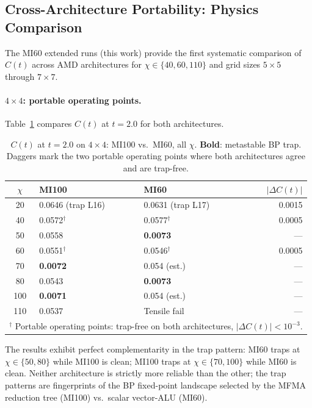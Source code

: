 \documentclass[11pt]{article}
\newcommand{\Ct}{C(t)}
\begin{document}
\subsection{Cross-Architecture Portability: Physics Comparison}
\label{sec:portability_physics}

The MI60 extended runs (this work) provide the first systematic comparison of
$\Ct$ across AMD architectures for $\chi \in \{40, 60, 110\}$ and grid sizes
$5\times5$ through $7\times7$.

\paragraph{$4\times4$: portable operating points.}
Table~\ref{tab:mi60_chi} compares $\Ct$ at $t=2.0$ for both architectures.

\begin{table}[ht]
\centering
\caption{$\Ct$ at $t = 2.0$ on $4\times4$: MI100 vs.\ MI60, all $\chi$.
  \textbf{Bold}: metastable BP trap.
  Daggers mark the two portable operating points where both architectures agree
  and are trap-free.}
\label{tab:mi60_chi}
\begin{tabular}{cllr}
\toprule
$\chi$ & MI100 & MI60 & $|\Delta \Ct|$ \\
\midrule
20  & 0.0646 (trap L16) & 0.0631 (trap L17) & 0.0015 \\
40  & 0.0572$^\dagger$  & 0.0577$^\dagger$   & 0.0005 \\
50  & 0.0558            & \textbf{0.0073}    & ---    \\
60  & 0.0551$^\dagger$  & 0.0546$^\dagger$   & 0.0005 \\
70  & \textbf{0.0072}   & 0.054 (est.)       & ---    \\
80  & 0.0543            & \textbf{0.0073}    & ---    \\
100 & \textbf{0.0071}   & 0.054 (est.)       & ---    \\
110 & 0.0537            & Tensile fail       & ---    \\
\midrule
\multicolumn{4}{l}{$^\dagger$ Portable operating points: trap-free on both architectures,
  $|\Delta\Ct| < 10^{-3}$.}\\
\bottomrule
\end{tabular}
\end{table}

The results exhibit perfect complementarity in the trap pattern:
MI60 traps at $\chi \in \{50, 80\}$ while MI100 is clean;
MI100 traps at $\chi \in \{70, 100\}$ while MI60 is clean.
Neither architecture is strictly more reliable than the other;
the trap patterns are fingerprints of the BP fixed-point landscape
selected by the MFMA reduction tree (MI100) vs.\ scalar vector-ALU (MI60).
\end{document}
